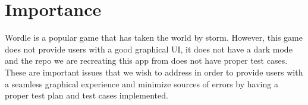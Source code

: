 \documentclass{article}
\begin{document}
\section{Importance}\label{sec:import}

Wordle is a popular game that has taken the world by storm. However, this game does not provide users with a good graphical UI, it does not have a dark mode and the repo we are recreating this app from does not have proper test cases. These are important issues that we wish to address in order to provide users with a seamless graphical experience and minimize sources of errors by having a proper test plan and test cases implemented.
\end{document}

